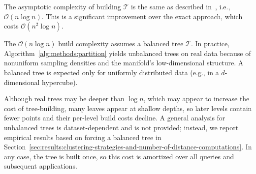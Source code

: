 The asymptotic complexity of building $\mathcal{T}$ is the same as described in~\cite{ishaq2019clustered}, i.e., $\mathcal{O}(n \log n)$.
This is a significant improvement over the exact approach, which costs $\mathcal{O}(n^2 \log n)$.



The $\mathcal{O}(n\log n)$ build complexity assumes a balanced tree $\mathcal{T}$. In practice, Algorithm~\ref{alg:methods:partition} yields unbalanced trees on real data because of nonuniform sampling densities and the manifold’s low-dimensional structure. A balanced tree is expected only for uniformly distributed data (e.g., in a $d$-dimensional hypercube).

Although real trees may be deeper than $\log n$, which may appear to increase the cost of tree-building, many leaves appear at shallow depths, so later levels contain fewer points and their per-level build costs decline. A general analysis for unbalanced trees is dataset-dependent and is not provided; instead, we report empirical results based on forcing a balanced tree in Section~\ref{sec:results:clustering-strategies-and-number-of-distance-computations}. In any case, the tree is built once, so this cost is amortized over all queries and subsequent applications.


